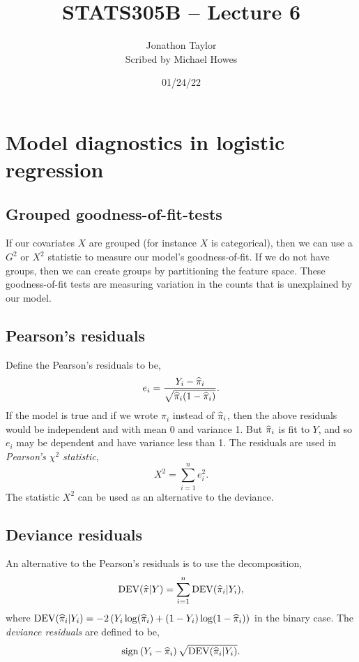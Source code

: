 




\title{STATS305B -- Lecture 6}
\author{Jonathon Taylor\\ Scribed by Michael Howes}
\date{01/24/22}

\pagestyle{fancy}
\fancyhf{}


\maketitle
\tableofcontents
\section{Model diagnostics in logistic regression}
\subsection{Grouped goodness-of-fit-tests}
If  our covariates  $X$ are grouped  (for instance  $X$ is categorical), then we  can  use  a  $G^2$  or $X^2$ statistic  to measure our  model's goodness-of-fit.  If we  do not have  groups, then we  can create groups  by partitioning the feature space. These goodness-of-fit tests  are  measuring  variation  in the counts  that  is   unexplained  by our  model.  
\subsection{Pearson's residuals}
Define the Pearson's residuals to be,
\[e_i   = \frac{Y_i-\widehat{\pi}_i}{\sqrt{\widehat{\pi}_i(1-\widehat{\pi}_i)}}. \]
If  the model is true and  if we  wrote  $\pi_i$ instead  of $\widehat{\pi}_i$, then the above  residuals  would  be independent and with mean  0 and variance  1. But $\widehat{\pi}_i$ is fit to $Y$, and  so  $e_i$  may be  dependent and have variance less than 1. The  residuals are used in  \emph{Pearson's $\chi^2$ statistic},
\[X^2 = \sum_{i=1}^n  e_i^2.\]
The  statistic $X^2$ can be used as an alternative to the  deviance.  
\subsection{Deviance residuals}
An alternative to the  Pearson's residuals is   to use  the  decomposition,
\[\operatorname{DEV}(\widehat{\pi}|Y)=\sum_{i=1}^n \operatorname{DEV}(\widehat{\pi}_i|Y_i),\]
where $\operatorname{DEV}(\widehat{\pi}_i|Y_i) =-2\left(Y_i\log(\widehat{\pi}_i)+(1-Y_i)\log(1-\widehat{\pi}_i)\right)$  in the binary case. The  \emph{deviance  residuals} are defined  to be,
\[\text{sign}\left(Y_i-\widehat{\pi}_i\right)\sqrt{\operatorname{DEV}(\widehat{\pi}_i|Y_i)}. \]
